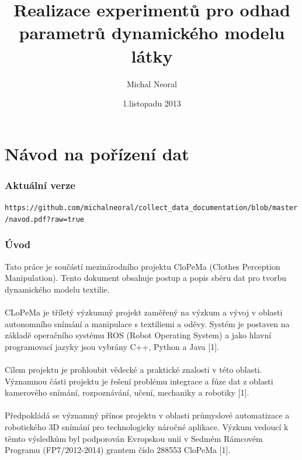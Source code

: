 \documentclass[10pt,a4paper,titlepage,oneside]{book}
\begin{document}
\title{Realizace experimentů pro odhad parametrů dynamického modelu látky}
\author{Michal Neoral}
\date{1.listopadu 2013}
\maketitle

\thispagestyle{fancy}

\part*{Návod na pořízení dat}

\section*{Aktuální verze}
\verb|https://github.com/michalneoral/collect_data_documentation/blob/master/navod.pdf?raw=true|\\

\section*{Úvod}

Tato práce je součástí mezinárodního projektu CloPeMa (Clothes Perception Manipulation). Tento dokument obsahuje postup a popis sběru dat pro tvorbu dynamického modelu textilie.\\
\\
CLoPeMa je tříletý výzkumný projekt zaměřený na výzkum a vývoj v oblasti autonomního snímání a manipulace s textiliemi a oděvy. Systém je postaven na základě operačního systému ROS (Robot Operating System) a jako hlavní programovací jazyky jsou vybrány C++, Python a Java [1].\\
\\
Cílem projektu je prohloubit vědecké a praktické znalosti v této oblasti. Významnou části projektu je řešení problému integrace a fúze dat z oblasti kamerového snímání, rozpoznávání, učení, mechaniky a robotiky [1].\\
\\
Předpokládá se významný přínos projektu v oblasti průmyslové automatizace a robotického 3D snímání pro technologicky náročné aplikace. Výzkum vedoucí k těmto výsledkům byl podporován Evropskou unií v Sedmém Rámcovém Programu (FP7/2012-2014) grantem číslo 288553 CloPeMa [1].\\
\\
\end{document}
